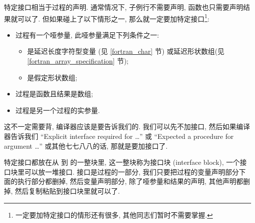 特定接口相当于过程的声明. 通常情况下, 子例行不需要声明, 函数也只需要声明结果就可以了. 但如果碰上了以下情形之一, 那么就一定要加特定接口\footnote{一定要加特定接口的情形还有很多, 其他同志们暂时不需要掌握.}:\label{whether_specific_interface}
\begin{itemize} 
    \item 过程有一个哑参量, 此哑参量满足下列条件之一: \begin{itemize} 
        \item 是延迟长度字符型变量 (见 \ref{fortran_char} 节) 或延迟形状数组(见\ref{fortran_array_specification} 节);
        \item 是假定形状数组;
    \end{itemize} 
    \item 过程是函数且结果是数组;
    \item 过程是另一个过程的实参量.
\end{itemize} 
这不一定需要背, 编译器应该是要告诉我们的. 我们可以先不加接口, 然后如果编译器告诉我们 ``Explicit interface required for \dots{}'' 或 ``Expected a procedure for argument \dots{}'' 或其他七七八八的话, 那就是要加接口了. 

特定接口都放在从  到  的一整块里, 这一整块称为接口块 (interface block), 一个接口块里可以放一堆接口. 接口是过程的一部分, 我们只要把过程的变量声明部分下面的执行部分都删掉, 然后变量声明部分, 除了哑参量和结果的声明, 其他声明都删掉, 然后复制粘贴到接口块里就可以了. 

